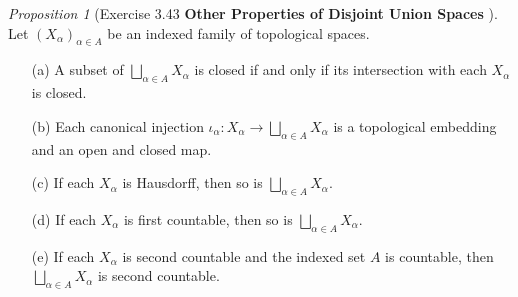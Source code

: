 \documentclass[a4paper]{article}
\theoremstyle{remark}
\newtheorem{prop}{Proposition}
\begin{document}
\begin{prop}[Exercise 3.43 \textbf{Other Properties of Disjoint Union Spaces} \cite{LeeTM}]
	Let $(X_{\alpha})_{\alpha \in A}$ be an indexed family of topological spaces.
	\begin{enumerate}[nolistsep]
		\item[(a)] A subset of $\bigsqcup_{\alpha \in A} X_{\alpha}$ is closed if and only if its intersection with each $X_{\alpha}$ is closed.
		\item [(b)] Each canonical injection $\iota_{\alpha} : X_{\alpha} \to \bigsqcup_{\alpha \in A} X_{\alpha}$ is a topological embedding and an open and closed map.
		\item [(c)] If each $X_{\alpha}$ is Hausdorff, then so is $\bigsqcup_{\alpha \in A} X_{\alpha}$.
		\item [(d)] If each $X_{\alpha}$ is first countable, then so is $\bigsqcup_{\alpha \in A} X_{\alpha}$.
		\item [(e)] If each $X_{\alpha}$ is second countable and the indexed set $A$ is countable, then $\bigsqcup_{\alpha \in A} X_{\alpha}$ is second countable.
	\end{enumerate}
\end{prop}
\end{document}
